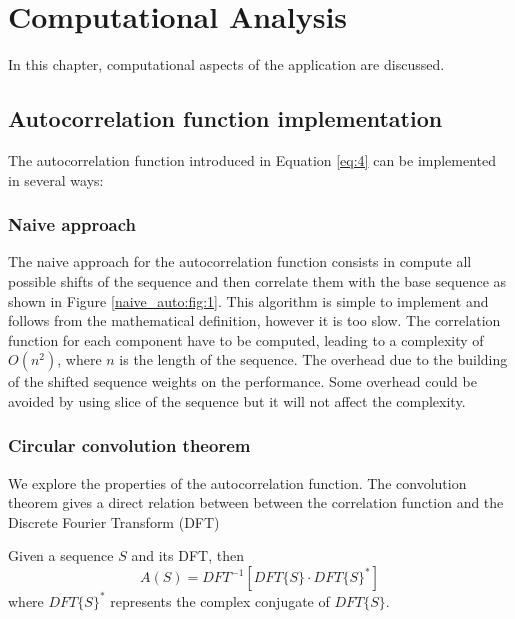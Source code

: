 \chapter{ Computational Analysis}\label{chap:computational_analysis}

In this chapter,  computational aspects of the application are discussed.


  \section{ Autocorrelation function implementation}
    The autocorrelation function introduced in Equation \eqref{eq:4} can be
    implemented in several ways:

      \subsection{Naive approach}
        The naive approach for the autocorrelation function consists in
        compute all possible shifts of the sequence and then
        correlate them with the base sequence as shown in Figure
        \ref{naive_auto:fig:1}.  This algorithm is simple to implement and
        follows from the mathematical definition, however it is too slow. The
        correlation function for each component have to be computed, leading to a
        complexity of $O(n^{2})$, where $n$ is the length of the sequence. The
        overhead due to the building of  the shifted sequence weights on the
        performance. Some overhead could be avoided by using slice of the sequence
        but it will not affect the complexity.\\

      \subsection{Circular convolution theorem}\label{section:impl:convolution}
      We explore the properties of the autocorrelation function. The convolution theorem\cite{golomb_ref} gives a  direct relation between between the correlation function and the Discrete Fourier Transform (DFT)\\
      \begin{theorem}
          Given a sequence $S$ and its DFT, then
          \begin{equation}
            A(S) = DFT^{-1}[DFT\{S\} · DFT\{S\}^{*}]
          \end{equation}
          where $DFT\{S\}^{*}$ represents the complex conjugate of $DFT\{S\}$.
        \end{theorem}

